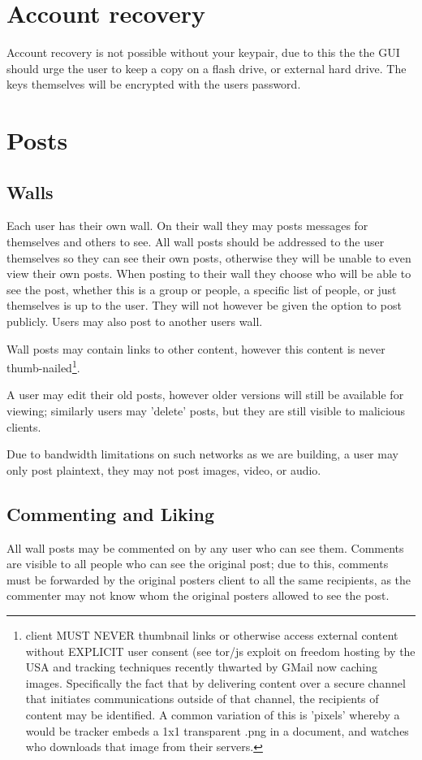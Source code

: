 \section{Account recovery}
Account recovery is not possible without your keypair, due to this the the GUI
should urge the user to keep a copy on a flash drive, or external hard drive.
The keys themselves will be encrypted with the users password.

\section{Posts}
\subsection{Walls}
Each user has their own wall. On their wall they may posts messages for
themselves and others to see. All wall posts should be addressed to the user
themselves so they can see their own posts, otherwise they will be unable to even
view their own posts. When posting to their wall they choose who will be able to
see the post, whether this is a group or people, a specific list of people, or
just themselves is up to the user. They will not however be given the option to
post publicly. Users may also post to another users wall.

Wall posts may contain links to other content, however this content is never
thumb-nailed\footnote{client MUST NEVER thumbnail links or otherwise access
external content without EXPLICIT user consent (see tor/js exploit on freedom
hosting by the USA and tracking techniques recently thwarted by GMail now
caching images. Specifically the fact that by delivering content over a secure
channel that initiates communications outside of that channel, the recipients of
content may be identified. A common variation of this is 'pixels' whereby a
would be tracker embeds a 1x1 transparent .png in a document, and watches who
downloads that image from their servers.\cite{webbug}}.

A user may edit their old posts, however older versions will still be available
for viewing; similarly users may 'delete' posts, but they are still visible to
malicious clients.

Due to bandwidth limitations on such networks as we are building, a user may
only post plaintext, they may not post images, video, or audio.

\subsection{Commenting and Liking}
All wall posts may be commented on by any user who can see them. Comments are
visible to all people who can see the original post; due to this, comments must
be forwarded by the original posters client to all the same recipients, as the
commenter may not know whom the original posters allowed to see the post.

